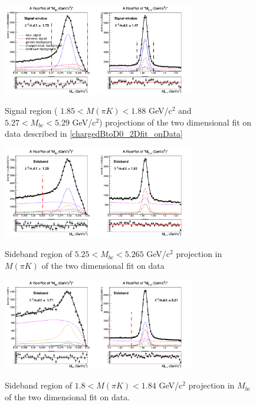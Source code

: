  \begin{figure}[h!]
{\includegraphics[width=0.75\textwidth]{A2-Appendix/figs/Signal_window_chargedControlD0_Total_2DFit_onData_free_sigmaCB1_InvMsigma.png}}
\caption{Signal region ( $1.85 < M(\pi K) < 1.88$ GeV/c$^2$ and $5.27 < M_{bc} < 5.29$ GeV/c$^2$) projections of the two dimensional fit on data described in \cref{chargedBtoD0_2Dfit_onData}}
\label{fig:Signal_window_chargedControlD0_Total_2DFit_onData_free_sigmaCB1_InvMsigma}
\end{figure}
 

  \begin{figure}[h!]
{\includegraphics[width=0.75\textwidth]{A2-Appendix/figs/Mbc_sideband_chargedControlD0_Total_2DFit_onData_free_sigmaCB1_InvMsigma.png}}
\caption{Sideband region of $5.25 < M_{bc} < 5.265$ GeV/c$^2$ projection in $M(\pi K)$  of the two dimensional fit on data}
\label{fig:Mbc_sideband_chargedControlD0_Total_2DFit_onData_free_sigmaCB1_InvMsigma}
\end{figure}
 
 \begin{figure}[h!]
{\includegraphics[width=0.75\textwidth]{A2-Appendix/figs/InvMsideband_chargedControlD0_Total_2DFit_onData_free_sigmaCB1_InvMsigma.png}}
\caption{Sideband region of $1.8 < M(\pi K) < 1.84$ GeV/c$^2$ projection in $M_{bc}$ of the two dimensional fit on data. }
\label{fig:InvMsideband_chargedControlD0_Total_2DFit_onData_free_sigmaCB1_InvMsigma}
\end{figure}
